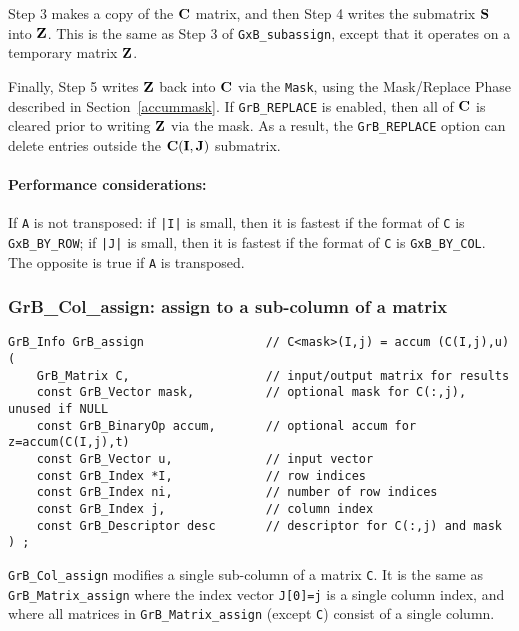 \documentclass[12pt]{article}
\begin{document}
Step 3 makes a copy of the ${\bf C}$ matrix, and then Step 4 writes the
submatrix ${\bf S}$ into ${\bf Z}$.  This is the same as Step 3 of
\verb'GxB_subassign', except that it operates on a temporary matrix ${\bf Z}$.

Finally, Step 5 writes ${\bf Z}$ back into ${\bf C}$ via the \verb'Mask', using
the Mask/Replace Phase described in Section~\ref{accummask}.  If
\verb'GrB_REPLACE' is enabled, then all of ${\bf C}$ is cleared prior to
writing ${\bf Z}$ via the mask.  As a result, the \verb'GrB_REPLACE' option can
delete entries outside the ${\bf C(I,J)}$ submatrix.

\paragraph{\bf Performance considerations:} %
If \verb'A' is not transposed: if \verb'|I|' is small, then it is fastest if
the format of \verb'C' is \verb'GxB_BY_ROW'; if \verb'|J|' is small, then it is
fastest if the format of \verb'C' is \verb'GxB_BY_COL'.  The opposite is true
if \verb'A' is transposed.

\newpage
\subsubsection{{\sf GrB\_Col\_assign:} assign to a sub-column of a matrix}
\label{assign_column}

\begin{mdframed}[userdefinedwidth=6in]
{\footnotesize
\begin{verbatim}
GrB_Info GrB_assign                 // C<mask>(I,j) = accum (C(I,j),u)
(
    GrB_Matrix C,                   // input/output matrix for results
    const GrB_Vector mask,          // optional mask for C(:,j), unused if NULL
    const GrB_BinaryOp accum,       // optional accum for z=accum(C(I,j),t)
    const GrB_Vector u,             // input vector
    const GrB_Index *I,             // row indices
    const GrB_Index ni,             // number of row indices
    const GrB_Index j,              // column index
    const GrB_Descriptor desc       // descriptor for C(:,j) and mask
) ;
\end{verbatim} } \end{mdframed}

\verb'GrB_Col_assign' modifies a single sub-column of a matrix \verb'C'.  It is
the same as \verb'GrB_Matrix_assign' where the index vector \verb'J[0]=j' is a
single column index, and where all matrices in \verb'GrB_Matrix_assign' (except
\verb'C') consist of a single column.
\end{document}
